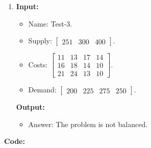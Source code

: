 \documentclass{article}
\begin{document}
\begin{enumerate}[label={(\arabic*)}, itemsep=0.25in]
\item \textbf{Input:}
\begin{itemize}
\item Name: Test-3.
\item Supply: \(\begin{bmatrix} 251 & 300 & 400 \end{bmatrix}\).
\item Costs: \(\begin{bmatrix}
11 & 13 & 17 & 14 \\
16 & 18 & 14 & 10 \\
21 & 24 & 13 & 10
\end{bmatrix}\).
\item Demand: \(\begin{bmatrix} 200 & 225 & 275 & 250 \end{bmatrix}\).
\end{itemize}
\textbf{Output:}
\begin{itemize}
\item Answer: The problem is not balanced.
\end{itemize}
\end{enumerate}

\newpage

\textbf{Code:}


\newpage


\newpage


\newpage


\newpage

\end{document}
